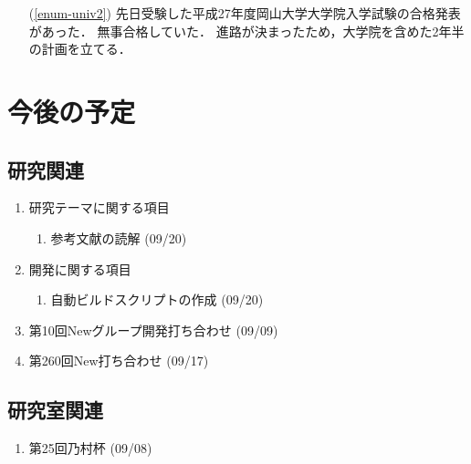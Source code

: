 \documentclass[fleqn, 14pt]{extarticle}
\begin{document}
\begin{itemize}
\item[(\ref{enum-univ2})]
先日受験した平成27年度岡山大学大学院入学試験の合格発表があった．
無事合格していた．
進路が決まったため，大学院を含めた2年半の計画を立てる．
\end{itemize}
\section{今後の予定}
\label{sec-4}
\subsection{研究関連}
\label{sec-4-1}

\begin{enumerate}
\item 研究テーマに関する項目
\hfill
\begin{enumerate}


\item 参考文献の読解
\hfill
(09/20)

\end{enumerate}
\item 開発に関する項目
\hfill
\begin{enumerate}

\item 自動ビルドスクリプトの作成
\hfill
(09/20)

\end{enumerate}
\item 第10回Newグループ開発打ち合わせ
\hfill
\label{enum-7}
(09/09)
\item 第260回New打ち合わせ
\hfill
\label{enum-3}
(09/17)
\end{enumerate}

\subsection{研究室関連}
\label{sec-4-2}

\begin{enumerate}



\item 第25回乃村杯
\hfill
\label{enum-8}
(09/08)

\end{enumerate}
\end{document}
